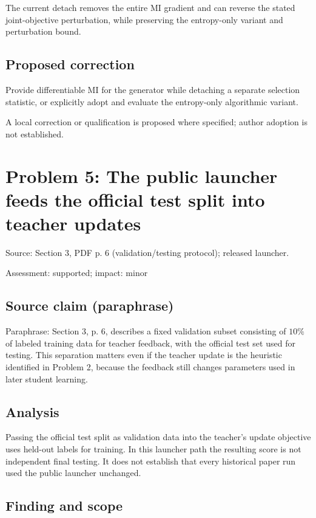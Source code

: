 \documentclass[11pt]{article}
\begin{document}
The current detach removes the entire MI gradient and can reverse the stated joint-objective perturbation, while preserving the entropy-only variant and perturbation bound.

\subsection*{Proposed correction}

Provide differentiable MI for the generator while detaching a separate selection statistic, or explicitly adopt and evaluate the entropy-only algorithmic variant.

A local correction or qualification is proposed where specified; author adoption is not established.

\section*{Problem 5: The public launcher feeds the official test split into teacher updates}

Source: Section 3, PDF p. 6 (validation/testing protocol); released launcher.

Assessment: supported; impact: minor

\subsection*{Source claim (paraphrase)}

Paraphrase: Section 3, p. 6, describes a fixed validation subset consisting of \(10\%\) of labeled training data for teacher feedback, with the official test set used for testing. This separation matters even if the teacher update is the heuristic identified in Problem 2, because the feedback still changes parameters used in later student learning.

\subsection*{Analysis}

Passing the official test split as validation data into the teacher's update objective uses held-out labels for training. In this launcher path the resulting score is not independent final testing. It does not establish that every historical paper run used the public launcher unchanged.

\subsection*{Finding and scope}
\end{document}
